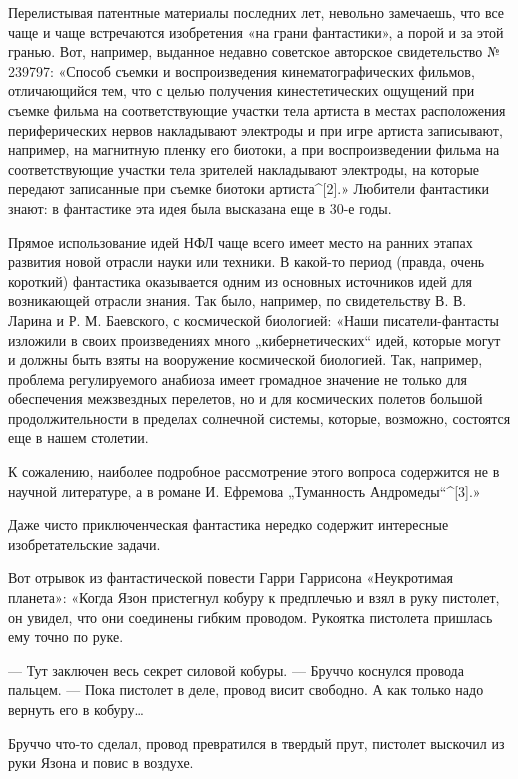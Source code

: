 Перелистывая патентные материалы  последних лет,  невольно замечаешь,  что
все чаще и чаще встречаются изобретения  «на грани фантастики», а порой  и
за этой  гранью.  Вот,  например,  выданное  недавно  советское  авторское
свидетельство    №    239797:    «Способ    съемки    и    воспроизведения
кинематографических фильмов,  отличающийся  тем,  что  с  целью  получения
кинестетических ощущений при съемке фильма на соответствующие участки тела
артиста в местах расположения периферических нервов накладывают  электроды
и при игре артиста записывают, например, на магнитную пленку его  биотоки,
а при  воспроизведении фильма  на  соответствующие участки  тела  зрителей
накладывают электроды, на которые  передают записанные при съемке  биотоки
артиста^[2].» Любители  фантастики  знают:  в  фантастике  эта  идея  была
высказана еще в 30-е годы.

Прямое использование  идей НФЛ  чаще всего  имеет место  на ранних  этапах
развития новой отрасли науки или техники. В какой-то период (правда, очень
короткий) фантастика  оказывается одним  из основных  источников идей  для
возникающей отрасли знания.  Так было,  например, по  свидетельству В.  В.
Ларина и Р. М. Баевского, с космической биологией: «Наши писатели-фантасты
изложили в своих произведениях много „кибернетических“ идей, которые могут
и должны быть  взяты на вооружение  космической биологией. Так,  например,
проблема регулируемого  анабиоза имеет  громадное значение  не только  для
обеспечения межзвездных перелетов,  но и для  космических полетов  большой
продолжительности  в  пределах   солнечной  системы,  которые,   возможно,
состоятся еще в нашем столетии.

К сожалению, наиболее подробное рассмотрение этого вопроса содержится не в
научной литературе, а в романе И. Ефремова „Туманность Андромеды“^[3].»

Даже  чисто   приключенческая  фантастика   нередко  содержит   интересные
изобретательские задачи.

Вот  отрывок  из  фантастической  повести  Гарри  Гаррисона   «Неукротимая
планета»: «Когда  Язон  пристегнул  кобуру  к предплечью  и  взял  в  руку
пистолет, он увидел, что они соединены гибким проводом. Рукоятка пистолета
пришлась ему точно по руке.

— Тут  заключен весь  секрет  силовой кобуры.  — Бруччо  коснулся  провода
пальцем. — Пока пистолет в деле, провод висит свободно. А как только  надо
вернуть его в кобуру…

Бруччо что-то сделал, провод превратился в твердый прут, пистолет выскочил
из руки Язона и повис в воздухе.

